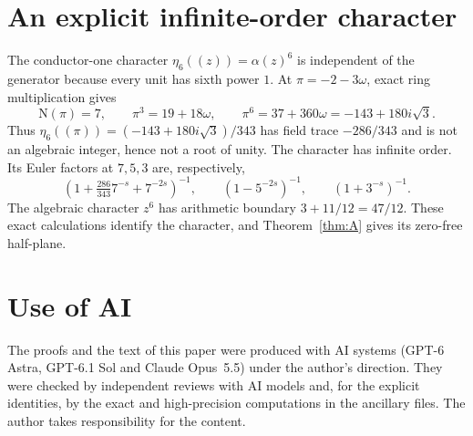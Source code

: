 \documentclass[11pt,a4paper]{article}
\numberwithin{equation}{section}
\theoremstyle{definition}
\theoremstyle{remark}
\newcommand{\N}{\mathrm N}
\begin{document}
\section{An explicit infinite-order character}\label{app:example}
The conductor-one character $\eta_6((z))=\alpha(z)^6$ is independent of the generator because every unit has sixth power $1$. At $\pi=-2-3\omega$, exact ring multiplication gives
\[
 \N(\pi)=7,\qquad\pi^3=19+18\omega,\qquad\pi^6=37+360\omega=-143+180i\sqrt3.
\]
Thus $\eta_6((\pi))=(-143+180i\sqrt3)/343$ has field trace $-286/343$ and is not an algebraic integer, hence not a root of unity. The character has infinite order. Its Euler factors at $7,5,3$ are, respectively,
\[
 (1+\tfrac{286}{343}7^{-s}+7^{-2s})^{-1},\qquad
 (1-5^{-2s})^{-1},\qquad(1+3^{-s})^{-1}.
\]
The algebraic character $z^6$ has arithmetic boundary $3+11/12=47/12$. These exact calculations identify the character, and Theorem~\ref{thm:A} gives its zero-free half-plane.



\section*{Use of AI}
The proofs and the text of this paper were produced with AI systems (GPT-6 Astra, GPT-6.1 Sol and Claude Opus~5.5) under the author's direction. They were checked by independent reviews with AI models and, for the explicit identities, by the exact and high-precision computations in the ancillary files. The author takes responsibility for the content.
\end{document}
